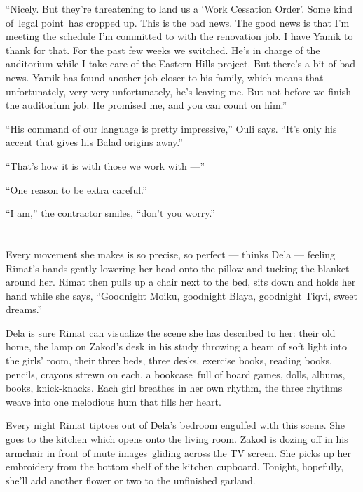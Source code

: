 \documentclass[twoside,11pt]{book}
\begin{document}
``Nicely. But they're threatening to land us a `Work Cessation Order'. Some kind of~legal point~has cropped
up. This is the bad news. The good news is that I'm meeting the schedule I'm committed to with the renovation job.  I
have Yamik to thank for that. For the past few weeks we switched. He's in charge of the auditorium while I take care of
the Eastern Hills project. But there's a bit of bad news. Yamik has found another job closer to his family, which means
that unfortunately, very-very unfortunately, he's leaving me. But not before we finish the auditorium job. He
promised me, and you can count on him.''

``His command of our language is pretty impressive,'' Ouli says. ``It's only his
accent that gives his Balad origins away.''

``That's how it is with those we work with ---''

``One reason to be extra careful.''

``I am,'' the contractor smiles, ``don't you worry.''



\chapter{}

Every movement she makes is so precise, so perfect --- thinks Dela --- feeling Rimat's hands gently lowering her head onto
the pillow and tucking the blanket around her. Rimat then pulls up a chair next to the bed, sits down and holds her
hand while she says, ``Goodnight Moiku, goodnight Blaya, goodnight Tiqvi, sweet dreams.''

Dela is sure Rimat can visualize the scene she has described to her: their old home, the lamp on Zakod's desk in his
study throwing a beam of soft light into the girls{'} room, their three beds, three desks, exercise books, reading
books, pencils, crayons strewn on each, a bookcase~full of board games, dolls, albums, books, knick-knacks. Each girl
breathes in her own rhythm, the three rhythms weave into one melodious hum that fills her heart.

Every night Rimat tiptoes out of Dela's bedroom engulfed with this scene. She goes to the kitchen which opens onto the
living room.  Zakod is dozing off in his armchair in front of mute images~gliding across the TV screen. She picks up
her embroidery from the bottom shelf of the kitchen cupboard. Tonight, hopefully, she'll add another flower or two to
the unfinished garland.
\end{document}
